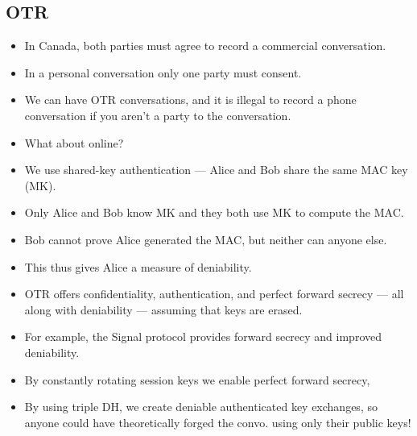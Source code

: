 \documentclass{article}
\begin{document}
\subsection{OTR}
\begin{itemize}
    \item In Canada, both parties must agree to record a commercial conversation.
    \item In a personal conversation only one party must consent.
    \item We can have OTR conversations, and it is illegal to record a phone conversation if you aren't a party to the conversation.
    \item What about online?
    \item We use shared-key authentication --- Alice and Bob share the same MAC key (MK).
    \item Only Alice and Bob know MK and they both use MK to compute the MAC.
    \item Bob cannot prove Alice generated the MAC, but neither can anyone else.
    \item This thus gives Alice a measure of deniability.
    \item OTR offers confidentiality, authentication, and perfect forward secrecy --- all along with deniability --- assuming that keys are erased.
    \item For example, the Signal protocol provides forward secrecy and improved deniability.
    \item By constantly rotating session keys we enable perfect forward secrecy,
    \item By using triple DH, we create deniable authenticated key exchanges, so anyone could have theoretically forged the convo. using only their public keys!
\end{itemize}
\end{document}
